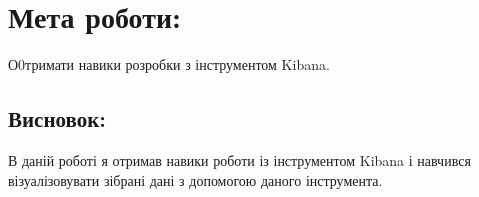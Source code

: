 



    

    \section*{Мета роботи:}
    \qquad  О0тримати навики розробки з інструментом Kibana.





    \subsection*{Висновок:}
    \qquad В даній роботі я отримав навики роботи із інструментом Kibana і навчився візуалізовувати зібрані дані з допомогою даного інструмента.
